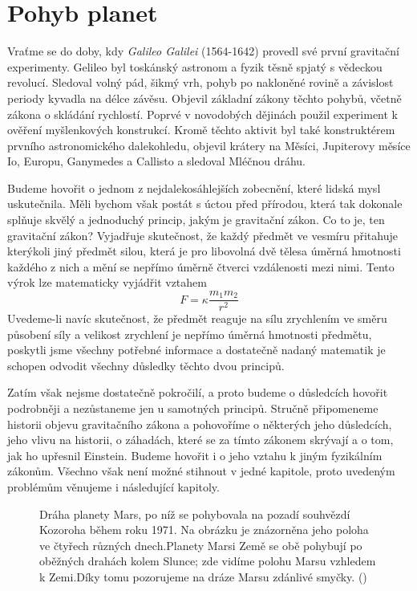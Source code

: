   \section{Pohyb planet}
    Vraťme se do doby, kdy \emph{Galileo Galilei} (1564-1642) provedl své první gravitační
    experimenty. Gelileo byl toskánský astronom a fyzik těsně spjatý s vědeckou revolucí. Sledoval
    volný pád, šikmý vrh, pohyb po nakloněné rovině a závislost periody kyvadla na délce závěsu.
    Objevil základní zákony těchto pohybů, včetně zákona o skládání rychlostí. Poprvé v novodobých
    dějinách použil experiment k ověření myšlenkových konstrukcí. Kromě těchto aktivit byl také
    konstruktérem prvního astronomického dalekohledu, objevil krátery na Měsíci, Jupiterovy měsíce
    Io, Europu, Ganymedes a Callisto a sledoval Mléčnou dráhu.

    Budeme hovořit o jednom z nejdalekosáhlejších zobecnění, které lidská mysl uskutečnila. Měli
    bychom však postát s úctou před přírodou, která tak dokonale splňuje skvělý a jednoduchý
    princip, jakým je gravitační zákon. Co to je, ten gravitační zákon? Vyjadřuje skutečnost, že
    každý předmět ve vesmíru přitahuje kterýkoli jiný předmět silou, která je pro libovolná dvě
    tělesa úměrná hmotnosti každého z nich a mění se nepřímo úměrně čtverci vzdálenosti mezi nimi.
    Tento výrok lze matematicky vyjádřit vztahem
    \begin{equation}\label{fyz:eq096}
      \boxed{F = \kappa\frac{m_1m_2}{r^2}}
    \end{equation}
    Uvedeme-li navíc skutečnost, že předmět reaguje na sílu zrychlením ve směru působení síly a 
    velikost zrychlení je nepřímo úměrná hmotnosti předmětu, poskytli jsme všechny potřebné 
    informace a dostatečně nadaný matematik je schopen odvodit všechny důsledky těchto dvou 
    principů.
    
    Zatím však nejsme dostatečně pokročilí, a proto budeme o důsledcích hovořit podrobněji a 
    nezůstaneme jen u samotných principů. Stručně připomeneme historii objevu gravitačního zákona a 
    pohovoříme o některých jeho důsledcích, jeho vlivu na historii, o záhadách, které se za tímto 
    zákonem skrývají a o tom, jak ho upřesnil Einstein. Budeme hovořit i o jeho vztahu k jiným 
    fyzikálním zákonům. Všechno však není možné stihnout v jedné kapitole, proto uvedeným problémům 
    věnujeme i následující kapitoly.

    \begin{figure}[ht!]  %
      \centering
      \caption{Dráha planety Mars, po níž se pohybovala na pozadí souhvězdí Kozoroha během roku 
               1971. Na obrázku je znázorněna jeho poloha ve čtyřech různých dnech.Planety Marsi 
               Země se obě pohybují po oběžných drahách kolem Slunce; zde vidíme polohu Marsu 
               vzhledem k Zemi.Díky tomu pozorujeme na dráze Marsu zdánlivé smyčky. 
               (\cite[s.~366]{Halliday2001})}
      \label{fyz:fig0299}
    \end{figure}
    
